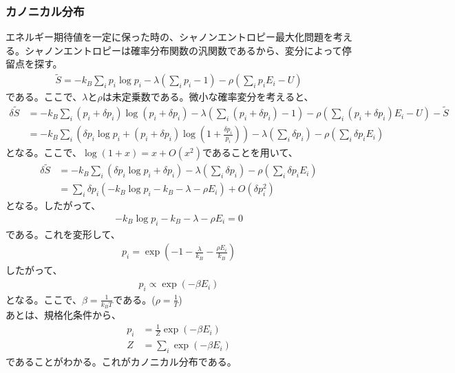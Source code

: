 \documentclass[a4paper,11pt]{jsarticle}
\numberwithin{equation}{section}
\begin{document}
\subsubsection{カノニカル分布}
エネルギー期待値を一定に保った時の、シャノンエントロピー最大化問題を考える。シャノンエントロピーは確率分布関数の汎関数であるから、変分によって停留点を探す。
\begin{align}
  \tilde{S}= -k_B\sum_{i}p_i\log p_i -\lambda\left(\sum_{i}p_i - 1\right)-\rho\left(\sum_{i}p_iE_i - U\right)  
\end{align}
である。ここで、$\lambda$と$\rho$は未定乗数である。微小な確率変分を考えると、
\begin{align}
  \delta \tilde{S} &= -k_B\sum_{i}(p_i + \delta p_i)\log (p_i + \delta p_i) -\lambda\left(\sum_{i}(p_i + \delta p_i)- 1\right) -\rho\left(\sum_{i}(p_i + \delta p_i)E_i - U\right)-\tilde{S}\\
  &= -k_B\sum_{i}\left(\delta p_i\log p_i + (p_i + \delta p_i)\log \left(1 + \frac{\delta p_i}{p_i}\right)\right)  -\lambda\left(\sum_{i}\delta p_i\right)-\rho\left(\sum_{i}\delta p_iE_i\right)
\end{align}
となる。ここで、$\log(1+x) = x + O(x^2)$であることを用いて、
\begin{align}
  \delta \tilde{S} &= -k_B\sum_{i}\left(\delta p_i\log p_i + \delta p_i\right)  -\lambda\left(\sum_{i}\delta p_i\right)-\rho\left(\sum_{i}\delta p_iE_i\right)\\
  &= \sum_{i}\delta p_i\left(-k_B\log p_i - k_B - \lambda - \rho E_i\right) + O(\delta p_i^2)
\end{align}
となる。したがって、
\begin{align}
  -k_B\log p_i - k_B - \lambda - \rho E_i = 0
\end{align}
である。これを変形して、
\begin{align}
  p_i = \exp(-1-\frac{\lambda}{k_B}-\frac{\rho E_i}{k_B})
\end{align}
したがって、
\begin{align}
  p_i \propto \exp(-\beta E_i)
\end{align}
となる。ここで、$\beta = \frac{1}{k_B T}$である。($\rho = \frac{1}{T}$)\\
あとは、規格化条件から、
\begin{align}
    p_i &= \frac{1}{Z} \exp(-\beta E_i)\\
    Z &= \sum_{i} \exp(-\beta E_i)
\end{align}
であることがわかる。これがカノニカル分布である。\\
\end{document}
